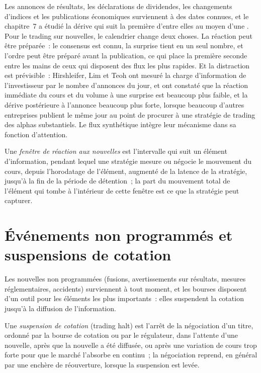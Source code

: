 Les annonces de résultats, les déclarations de dividendes, les changements d'indices et les publications économiques surviennent à des dates connues, et le chapitre~7 a étudié la dérive qui suit la première
d'entre elles au moyen d'une . Pour le trading sur nouvelles, le calendrier change deux choses. La réaction peut être préparée~: le consensus est connu, la surprise tient en un seul nombre,
et l'ordre peut être préparé avant la publication, ce qui place la première seconde entre les mains de ceux qui disposent des flux les plus rapides. Et la distraction est prévisible~:
Hirshleifer, Lim et Teoh ont mesuré la charge d'information de l'investisseur par le nombre d'annonces du jour, et ont constaté que la
réaction immédiate du cours et du volume à une surprise est beaucoup plus faible, et la dérive postérieure à l'annonce beaucoup plus forte, lorsque beaucoup d'autres entreprises publient le même jour
au point de procurer à une stratégie de trading des alphas substantiels. Le flux synthétique intègre leur mécanisme dans sa fonction d'attention.

\begin{definition}\label{def:s1:news-and-events:window}
Une \emph{fenêtre de réaction aux nouvelles} est l'intervalle qui suit un élément d'information, pendant lequel une stratégie mesure ou négocie le mouvement du cours, depuis
l'horodatage de l'élément, augmenté de la latence de la stratégie, jusqu'à la fin de la période de détention~; la part du mouvement total de l'élément qui tombe à l'intérieur
de cette fenêtre est ce que la stratégie peut capturer.
\end{definition}

\section{Événements non programmés et suspensions de cotation}

Les nouvelles non programmées (fusions, avertissements sur résultats, mesures réglementaires, accidents) surviennent à tout moment, et les bourses disposent d'un outil pour les éléments les plus importants~:
elles suspendent la cotation jusqu'à la diffusion de l'information.

\begin{definition}\label{def:s1:news-and-events:halt}
Une \emph{suspension de cotation} (trading halt) est l'arrêt de la négociation d'un titre, ordonné par la bourse de cotation ou par le régulateur, dans l'attente d'une nouvelle, après que la nouvelle a été diffusée,
ou après une variation de cours trop forte pour que le marché l'absorbe en continu~; la négociation reprend, en général par une enchère de réouverture, lorsque
la suspension est levée.
\end{definition}

